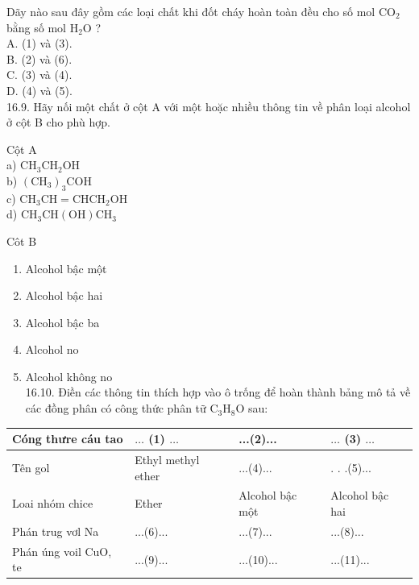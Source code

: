 \documentclass[10pt]{article}
\begin{document}
Dãy nào sau đây gồm các loại chất khi đốt cháy hoàn toàn đều cho số mol $\mathrm{CO}_{2}$ bằng số mol $\mathrm{H}_{2} \mathrm{O}$ ?\\
A. (1) và (3).\\
B. (2) và (6).\\
C. (3) và (4).\\
D. (4) và (5).\\
16.9. Hãy nối một chất ở cột A với một hoặc nhiều thông tin về phân loại alcohol ở cột B cho phù hợp.

Cột A\\
a) $\mathrm{CH}_{3} \mathrm{CH}_{2} \mathrm{OH}$\\
b) $\left(\mathrm{CH}_{3}\right)_{3} \mathrm{COH}$\\
c) $\mathrm{CH}_{3} \mathrm{CH}=\mathrm{CHCH}_{2} \mathrm{OH}$\\
d) $\mathrm{CH}_{3} \mathrm{CH}(\mathrm{OH}) \mathrm{CH}_{3}$

Côt B

\begin{enumerate}
  \item Alcohol bậc một
  \item Alcohol bậc hai
  \item Alcohol bậc ba
  \item Alcohol no
  \item Alcohol không no\\
16.10. Điền các thông tin thích hợp vào ô trống để hoàn thành bảng mô tả về các đồng phân có công thức phân tữ $\mathrm{C}_{3} \mathrm{H}_{8} \mathrm{O}$ sau:
\end{enumerate}

\begin{center}
\begin{tabular}{|l|l|l|l|}
\hline
Cóng thưre cáu tao & $\ldots$ (1) $\ldots$ & ...(2)... & $\ldots$ (3) $\ldots$ \\
\hline
Tên gol & Ethyl methyl ether & ...(4)... & . . .(5)... \\
\hline
Loai nhóm chice & Ether & Alcohol bậc một & Alcohol bậc hai \\
\hline
Phán trug vơl Na & ...(6)... & ...(7)... & ...(8)... \\
\hline
Phán úng voil CuO, te & ...(9)... & ...(10)... & ...(11)... \\
\hline
\end{tabular}
\end{center}
\end{document}
